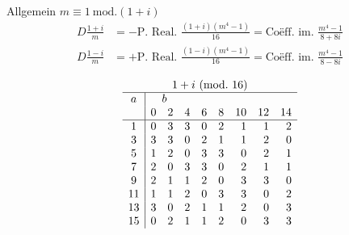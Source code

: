 
Allgemein $m\equiv1\ \mathrm{mod.}(1+i)$
\[
\begin{aligned}
D\frac{1+i}m&=-\text{P. Real. }\frac{(1+i)(m^4-1)}{16}=\text{Coëff. im. }\frac{m^4-1}{8+8i}\\
D\frac{1-i}m&=+\text{P. Real. }\frac{(1-i)(m^4-1)}{16}=\text{Coëff. im. }\frac{m^4-1}{8-8i}
\end{aligned}
\]

\[
\begin{array}{c|rrrrrrrr}
\multicolumn{9}{c}{1+i\ (\mathrm{mod.}\ 16)}\\\hline
a&\multicolumn{8}{l}{\quad b}\\
&0&2&4&6&8&10&12&14\\\hline
1&0&3&3&0&2&1&1&2\\
3&3&3&0&2&1&1&2&0\\
5&1&2&0&3&3&0&2&1\\
7&2&0&3&3&0&2&1&1\\
9&2&1&1&2&0&3&3&0\\
11&1&1&2&0&3&3&0&2\\
13&3&0&2&1&1&2&0&3\\
15&0&2&1&1&2&0&3&3
\end{array}
\]
